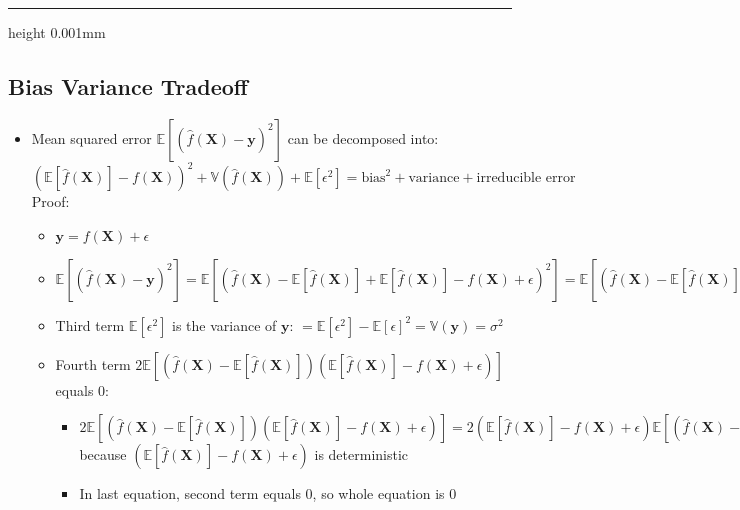 {\color{black}\hrule height 0.001mm}

\subsection*{Bias Variance Tradeoff}
\begin{itemize}
    \item Mean squared error $\mathbb{E}[ (\hat{f}(\boldsymbol{X}) - \boldsymbol{y})^2 ]$ can be decomposed into: $( \mathbb{E}[\hat{f}(\boldsymbol{X})] - f(\boldsymbol{X}) )^2 + \mathbb{V}(\hat{f}(\boldsymbol{X})) + \mathbb{E}[\epsilon^2] = \textrm{bias}^2 + \textrm{variance} + \textrm{irreducible error}$\\
    Proof:
    \begin{itemize}
        \item $\boldsymbol{y} = f(\boldsymbol{X}) + \epsilon$
        \item $\mathbb{E}[ (\hat{f}(\boldsymbol{X}) - \boldsymbol{y})^2 ] = \mathbb{E}[ (\hat{f}(\boldsymbol{X}) - \mathbb{E}[\hat{f}(\boldsymbol{X})] + \mathbb{E}[\hat{f}(\boldsymbol{X})] - f(\boldsymbol{X}) + \epsilon)^2 ] = \mathbb{E}[ (\hat{f}(\boldsymbol{X}) - \mathbb{E}[\hat{f}(\boldsymbol{X})] )^2 ] + \mathbb{E}[(\mathbb{E}[\hat{f}(\boldsymbol{X})] - f(\boldsymbol{X}))^2] + \mathbb{E}[\epsilon^2] - 2 \mathbb{E}[ (\hat{f}(\boldsymbol{X}) - \mathbb{E} [ \hat{f}(\boldsymbol{X}) ] ) ( \mathbb{E} [ \hat{f}(\boldsymbol{X}) ] - f(\boldsymbol{X}) + \epsilon ) ]$
        \item Third term $\mathbb{E}[\epsilon^2]$ is the variance of $\boldsymbol{y}$: $ = \mathbb{E}[\epsilon^2] - \mathbb{E}[\epsilon]^2 = \mathbb{V}(\boldsymbol{y}) = \sigma^2$
        \item Fourth term $2 \mathbb{E}[ (\hat{f}(\boldsymbol{X}) - \mathbb{E} [ \hat{f}(\boldsymbol{X}) ] ) ( \mathbb{E} [ \hat{f}(\boldsymbol{X}) ] - f(\boldsymbol{X}) + \epsilon ) ]$ equals 0:
        \begin{itemize}
            \item $2 \mathbb{E}[ (\hat{f}(\boldsymbol{X}) - \mathbb{E} [ \hat{f}(\boldsymbol{X}) ] ) ( \mathbb{E} [ \hat{f}(\boldsymbol{X}) ] - f(\boldsymbol{X}) + \epsilon ) ] = 2( \mathbb{E} [ \hat{f}(\boldsymbol{X}) ] - f(\boldsymbol{X}) + \epsilon ) \mathbb{E}[ (\hat{f}(\boldsymbol{X}) - \mathbb{E} [ \hat{f}(\boldsymbol{X}) ] ) ]$ because $( \mathbb{E} [ \hat{f}(\boldsymbol{X}) ] - f(\boldsymbol{X}) + \epsilon ) $ is deterministic
            \item In last equation, second term equals 0, so whole equation is 0

\end{itemize}
\end{itemize}
\end{itemize}
